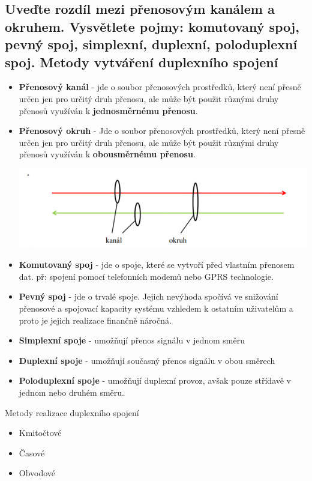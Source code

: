 \subsection{Uveďte rozdíl mezi přenosovým kanálem a okruhem. Vysvětlete pojmy: komutovaný spoj, pevný spoj, simplexní, duplexní, poloduplexní spoj. Metody vytváření duplexního spojení}
\begin{itemize}
    \item \textbf{Přenosový kanál} - jde o soubor přenosových prostředků, který není přesně určen jen pro určitý druh přenosu, ale může být použit různými druhy přenosů využíván k  \textbf{jednosměrnému přenosu}.

    \item \textbf{Přenosový okruh} - Jde o soubor přenosových prostředků, který není přesně určen jen pro určitý druh přenosu, ale může být použit různými druhy přenosů využíván k \textbf{obousměrnému přenosu}.
    
    \includegraphics[]{images/okruh_kanal.png}
    
    \item \textbf{Komutovaný spoj} - jde o spoje, které se vytvoří před vlastním přenosem dat. př: spojení pomocí telefonních modemů nebo GPRS technologie.
    \item \textbf{Pevný spoj} - jde o trvalé spoje. Jejich nevýhoda spočívá ve snižování přenosové a spojovací kapacity systému vzhledem k ostatním uživatelům a proto je jejich realizace finančně náročná.
    \item \textbf{Simplexní spoje} - umožňují přenos signálu v jednom směru
    \item \textbf{Duplexní spoje} - umožňují současný přenos signálu v obou směrech
    \item \textbf{Poloduplexní spoje} - umožňují duplexní provoz, avšak pouze střídavě v jednom nebo druhém směru.
\end{itemize}
Metody realizace duplexního spojení
\begin{itemize}
    \item Kmitočtové
    \item Časové
    \item Obvodové
\end{itemize}

